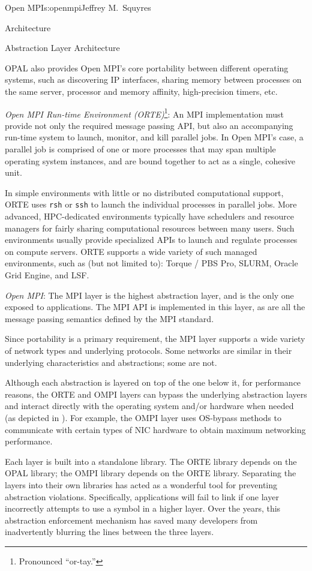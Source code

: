 \begin{aosachapter}{Open MPI}{s:openmpi}{Jeffrey M.\ Squyres}
\begin{aosasect1}{Architecture}
\begin{aosasect2}{Abstraction Layer Architecture}
\begin{aosaitemize}
  OPAL also provides Open MPI's core portability between different
  operating systems, such as discovering IP interfaces, sharing
  memory between processes on the same server, processor and memory
  affinity, high-precision timers, etc.

\item {\em Open MPI Run-time Environment (ORTE)}\footnote{Pronounced
    ``or-tay.''}: An MPI implementation must provide not only the
  required message passing API, but also an accompanying run-time
  system to launch, monitor, and kill parallel jobs.  In Open MPI's
  case, a parallel job is comprised of one or more processes that may
  span multiple operating system instances, and are bound together to
  act as a single, cohesive unit.

  In simple environments with little or no distributed computational
  support, ORTE uses {\tt rsh} or {\tt ssh} to launch the individual
  processes in parallel jobs.  More advanced, HPC-dedicated
  environments typically have schedulers and resource managers for
  fairly sharing computational resources between many users.  Such
  environments usually provide specialized APIs to launch and regulate
  processes on compute servers.  ORTE supports a wide variety of such
  managed environments, such as (but not limited to): Torque / PBS
  Pro, SLURM, Oracle Grid Engine, and LSF.

\item {\em Open MPI}: The MPI layer is the highest abstraction layer,
  and is the only one exposed to applications.  The MPI API is
  implemented in this layer, as are all the message passing semantics
  defined by the MPI standard.

  Since portability is a primary requirement, the MPI layer supports a
  wide variety of network types and underlying protocols.  Some
  networks are similar in their underlying characteristics and
  abstractions; some are not.
\end{aosaitemize}

Although each abstraction is layered on top of the one below it, for
performance reasons, the ORTE and OMPI layers can bypass the
underlying abstraction layers and interact directly with the operating
system and/or hardware when needed (as depicted in
).  For example, the OMPI layer uses
OS-bypass methods to communicate with certain types of NIC hardware to
obtain maximum networking performance.

Each layer is built into a standalone library.  The ORTE library
depends on the OPAL library; the OMPI library depends on the ORTE
library.
%
Separating the layers into their own libraries has acted as a
wonderful tool for preventing abstraction violations.
%
Specifically, applications will fail to link if one layer incorrectly
attempts to use a symbol in a higher layer.
%
Over the years, this abstraction enforcement mechanism has saved many
developers from inadvertently blurring the lines between the three
layers.


\end{aosasect2}
\end{aosasect1}
\end{aosachapter}
